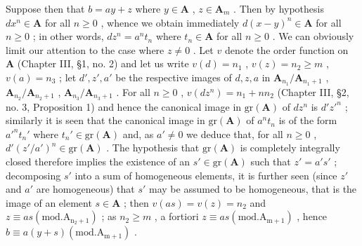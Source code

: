 Suppose then that \(b = ay + z\) where \(y \in \mathbf{A}\) , \(z \in \mathbf{A}_m\) . Then by hypothesis \(dx^n \in \mathbf{A}\) for all \(n \geqslant 0\) , whence we obtain immediately \(d(x - y)^n \in \mathbf{A}\) for all \(n \geqslant 0\) ; in other words, \(dz^n = a^n t_n\) where \(t_n \in \mathbf{A}\) for all \(n \geqslant 0\) . We can obviously limit our attention to the case where \(z \neq 0\) . Let \(v\) denote the order function on \(\mathbf{A}\) (Chapter III, §1, no. 2) and let us write \(v(d) = n_1\) , \(v(z) = n_2 \geqslant m\) , \(v(a) = n_3\) ; let \(d', z', a'\) be the respective images of \(d, z, a\) in \(\mathbf{A}_{n_1}/\mathbf{A}_{n_1+1}\) , \(\mathbf{A}_{n_2}/\mathbf{A}_{n_2+1}\) , \(\mathbf{A}_{n_3}/\mathbf{A}_{n_3+1}\) . For all \(n \geqslant 0\) , \(v(dz^n) = n_1 + nn_2\) (Chapter III, §2, no. 3, Proposition 1) and hence the canonical image in \(\mathrm{gr}(\mathbf{A})\) of \(dz^n\) is \(d'z'^n\) ; similarly it is seen that the canonical image in \(\mathrm{gr}(\mathbf{A})\) of \(a^n t_n\) is of the form \(a'^n t_n'\) where \(t_n' \in \mathrm{gr}(\mathbf{A})\) and, as \(a' \neq 0\) we deduce that, for all \(n \geqslant 0\) , \(d'(z'/a')^n \in \mathrm{gr}(\mathbf{A})\) . The hypothesis that \(\mathrm{gr}(\mathbf{A})\) is completely integrally closed therefore implies the existence of an \(s' \in \mathrm{gr}(\mathbf{A})\) such that \(z' = a's'\) ; decomposing \(s'\) into a sum of homogeneous elements, it is further seen (since \(z'\) and \(a'\) are homogeneous) that \(s'\) may be assumed to be homogeneous, that is the image of an element \(s \in \mathbf{A}\) ; then \(v(as) = v(z) = n_2\) and \(z \equiv as (\mathrm{mod. A_{n_2+1}})\) ; as \(n_2 \geqslant m\) , a fortiori \(z \equiv as (\mathrm{mod. A_{m+1}})\) , hence \(b \equiv a(y + s) (\mathrm{mod. A_{m+1}})\) .
\relax{}
